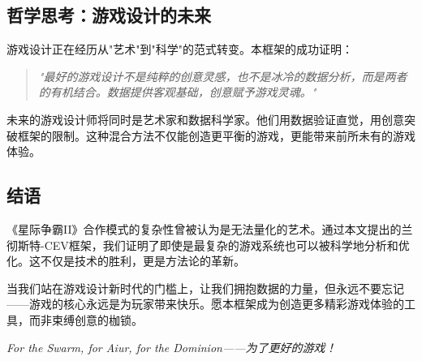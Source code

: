 \documentclass[a4paper,12pt]{article}
\begin{document}
\subsection{哲学思考：游戏设计的未来}

游戏设计正在经历从"艺术"到"科学"的范式转变。本框架的成功证明：

\begin{quote}
\textit{"最好的游戏设计不是纯粹的创意灵感，也不是冰冷的数据分析，而是两者的有机结合。数据提供客观基础，创意赋予游戏灵魂。"}
\end{quote}

未来的游戏设计师将同时是艺术家和数据科学家。他们用数据验证直觉，用创意突破框架的限制。这种混合方法不仅能创造更平衡的游戏，更能带来前所未有的游戏体验。

\subsection{结语}

《星际争霸II》合作模式的复杂性曾被认为是无法量化的艺术。通过本文提出的兰彻斯特-CEV框架，我们证明了即使是最复杂的游戏系统也可以被科学地分析和优化。这不仅是技术的胜利，更是方法论的革新。

当我们站在游戏设计新时代的门槛上，让我们拥抱数据的力量，但永远不要忘记——游戏的核心永远是为玩家带来快乐。愿本框架成为创造更多精彩游戏体验的工具，而非束缚创意的枷锁。

\begin{center}
\textit{For the Swarm, for Aiur, for the Dominion——为了更好的游戏！}
\end{center}
\end{document}
